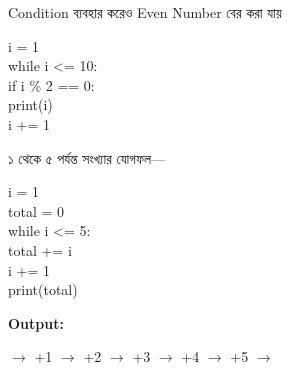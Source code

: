 \begin{examplebox}{Condition ব্যবহার করেও Even Number বের করা যায়}

\begin{codebox}
\begin{english}
\ttfamily
i = 1\\
while i <= 10:\\
\hspace*{4mm}if i \% 2 == 0:\\
\hspace*{8mm}print(i)\\
\hspace*{4mm}i += 1
\end{english}
\end{codebox}

\end{examplebox}



১ থেকে ৫ পর্যন্ত সংখ্যার যোগফল—

\begin{codebox}
\begin{english}
\ttfamily
i = 1\\
total = 0\\[0.5mm]
while i <= 5:\\
\hspace*{4mm}total += i\\
\hspace*{4mm}i += 1\\[0.5mm]
print(total)
\end{english}
\end{codebox}

\textbf{Output:}
\textenglish{}

\begin{center}

\textenglish{}
\(\longrightarrow\)
\textenglish{\ttfamily +1}
\(\longrightarrow\)
\textenglish{\ttfamily +2}
\(\longrightarrow\)
\textenglish{\ttfamily +3}
\(\longrightarrow\)
\textenglish{\ttfamily +4}
\(\longrightarrow\)
\textenglish{\ttfamily +5}
\(\longrightarrow\)
\textenglish{}

\end{center}

